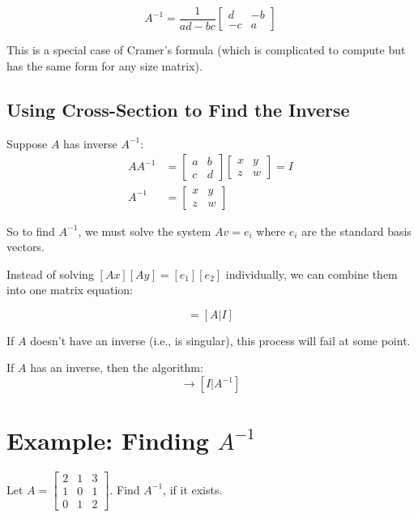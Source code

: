 \documentclass[12pt,a4paper]{article}
\begin{document}
\begin{equation}
A^{-1} = \frac{1}{ad-bc} \begin{bmatrix} d & -b \\ -c & a \end{bmatrix}
\end{equation}

This is a special case of Cramer's formula (which is complicated to compute but has the same form for any size matrix).

\subsection{Using Cross-Section to Find the Inverse}

Suppose $A$ has inverse $A^{-1}$:
\begin{align*}
AA^{-1} &= \begin{bmatrix} a & b \\ c & d \end{bmatrix} \begin{bmatrix} x & y \\ z & w \end{bmatrix} = I \\
A^{-1} &= \begin{bmatrix} x & y \\ z & w \end{bmatrix}
\end{align*}

So to find $A^{-1}$, we must solve the system $Av = e_i$ where $e_i$ are the standard basis vectors.

Instead of solving $[Ax] [Ay] = [e_1] [e_2]$ individually, we can combine them into one matrix equation:

\begin{equation}
[A|e_1, e_2, \ldots] = [A|I]
\end{equation}

If $A$ doesn't have an inverse (i.e., is singular), this process will fail at some point.

If $A$ has an inverse, then the algorithm:
\begin{equation}
[A|I] \rightarrow [I|A^{-1}]
\end{equation}

\section{Example: Finding $A^{-1}$}

Let $A = \begin{bmatrix} 2 & 1 & 3 \\ 1 & 0 & 1 \\ 0 & 1 & 2 \end{bmatrix}$. Find $A^{-1}$, if it exists.
\end{document}

